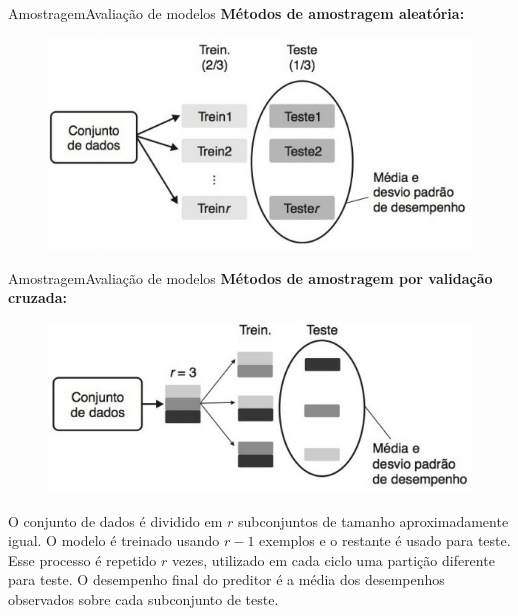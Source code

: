 \documentclass[t]{beamer}
\begin{document}
\begin{ftst}{Amostragem}{Avaliação de modelos}
\justifying
\textbf{Métodos de amostragem aleatória:}
\vone
\begin{figure}
    \centering
    \includegraphics[scale=0.7]{Figuras/slide04_03.jpg}
\end{figure}

\end{ftst}


\begin{ftst}{Amostragem}{Avaliação de modelos}
\justifying
\textbf{Métodos de amostragem por validação cruzada:}
\vone
\begin{figure}
    \centering
    \includegraphics[scale=0.5]{Figuras/slide04_04.jpg}
\end{figure}
\small
O conjunto de dados é dividido em $r$ subconjuntos de tamanho aproximadamente igual. O modelo é treinado usando $r-1$ exemplos e o restante é usado para teste. Esse processo é repetido $r$ vezes, utilizado em cada ciclo uma partição diferente para teste.
\vone
O desempenho final do preditor é a média dos desempenhos observados sobre cada subconjunto de teste.

\end{ftst}

\end{document}
